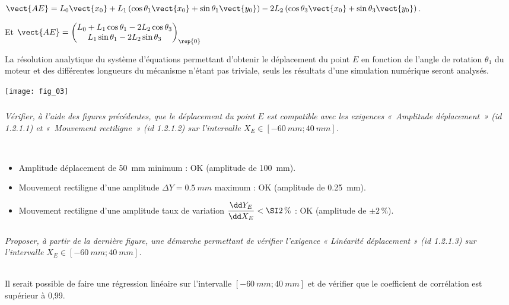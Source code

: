 \begin{multicols}{2}
\begin{corrige}
  $\vect{AE}=L_0\vect{x_0}+L_1\left( \cos \theta_1 \vect{x_0}+ \sin \theta_1 \vect{y_0} \right)-2L_2\left( \cos \theta_3\vect{x_0} + \sin \theta_3\vect{y_0}  \right)$. 
  
  Et $\vect{AE}=\begin{pmatrix} 
    L_0+L_1 \cos \theta_1 -2L_2\cos \theta_3 \\    
    L_1 \sin \theta_1 -2L_2 \sin \theta_3
  \end{pmatrix}_{\rep{0}}$
 
\end{corrige}
\else
\fi

\ifprof
\else

La résolution analytique du système d’équations permettant d’obtenir le déplacement du
point $E$ en fonction de l’angle de rotation $\theta_1$ du moteur et des différentes longueurs du mécanisme
n’étant pas triviale, seuls les résultats d’une simulation numérique seront analysés.

\begin{center}
\texttt{[image: fig\_03]}
\end{center}
\fi


\subparagraph{}\textit{Vérifier, à l’aide des figures précédentes, que le déplacement du point $E$ est compatible avec les
exigences «~Amplitude déplacement~» (id 1.2.1.1) et «~Mouvement rectiligne~» (id 1.2.1.2) sur
l’intervalle $X_E \in \left[-\SI{60}{mm}; \SI{40}{mm}\right]$.}
\ifprof
\begin{corrige}~\\
\begin{itemize}
\item Amplitude déplacement de \SI{50}{mm} minimum : OK (amplitude de \SI{100}{mm}).
\item Mouvement rectiligne d'une amplitude $\Delta Y= \SI{0,5}{mm}$ maximum : OK (amplitude de \SI{0,25}{mm}).
\item Mouvement rectiligne d'une amplitude taux de variation $\dfrac{\dd Y_E}{\dd X_E}<\SI2\,\%$  : OK  (amplitude de $\pm 2\,\%$).
\end{itemize}
\end{corrige}
\else
\fi

\subparagraph{}\textit{Proposer, à partir de la dernière figure, une démarche permettant de vérifier l’exigence « Linéarité
déplacement » (id 1.2.1.3) sur l’intervalle $X_E \in \left[-\SI{60}{mm}; \SI{40}{mm}\right]$.}
\ifprof
\begin{corrige}~\\
Il serait possible de faire une régression linéaire sur l'intervalle $\left[-\SI{60}{mm}; \SI{40}{mm}\right]$ et de vérifier que le coefficient de corrélation est supérieur à 0,99.
\end{corrige}
\else
\fi


\end{multicols}
